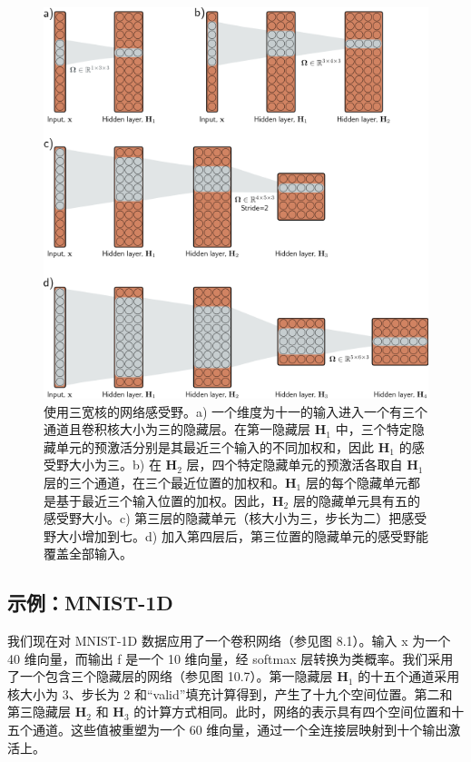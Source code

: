 \begin{figure}[ht!]
\centering
\includegraphics[width=0.7\linewidth]{png/chapter10/ConvNetworkRF.png}
\caption{使用三宽核的网络感受野。a) 一个维度为十一的输入进入一个有三个通道且卷积核大小为三的隐藏层。在第一隐藏层 \(\mathbf{H}_1\) 中，三个特定隐藏单元的预激活分别是其最近三个输入的不同加权和，因此 \(\mathbf{H}_1\) 的感受野大小为三。b) 在 \(\mathbf{H}_2\) 层，四个特定隐藏单元的预激活各取自 \(\mathbf{H}_1\) 层的三个通道，在三个最近位置的加权和。\(\mathbf{H}_1\) 层的每个隐藏单元都是基于最近三个输入位置的加权。因此，\(\mathbf{H}_2\) 层的隐藏单元具有五的感受野大小。c) 第三层的隐藏单元（核大小为三，步长为二）把感受野大小增加到七。d) 加入第四层后，第三位置的隐藏单元的感受野能覆盖全部输入。}
\end{figure}

\subsection{示例：MNIST-1D}
我们现在对 MNIST-1D 数据应用了一个卷积网络（参见图 8.1）。输入 x 为一个 40 维向量，而输出 f 是一个 10 维向量，经 softmax 层转换为类概率。我们采用了一个包含三个隐藏层的网络（参见图 10.7）。第一隐藏层 \(\mathbf{H}_1\) 的十五个通道采用核大小为 3、步长为 2 和“valid”填充计算得到，产生了十九个空间位置。第二和第三隐藏层 \(\mathbf{H}_2\) 和 \(\mathbf{H}_3\) 的计算方式相同。此时，网络的表示具有四个空间位置和十五个通道。这些值被重塑为一个 60 维向量，通过一个全连接层映射到十个输出激活上。


